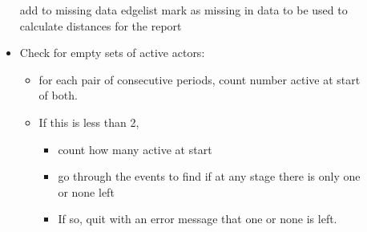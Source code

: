 \documentclass[12pt,a4paper]{article}
\renewcommand{\=}{\,=\,}
\newcommand{\+}{\,+\,}
\begin{document}
\begin{description}
\begin{itemize}
\begin{algorithmic}
\STATE add to missing data edgelist
\STATE mark as missing in data to be used to calculate distances for the report
\ENDIF
\ENDFOR
\ENDFOR
\ENDFOR
\end{algorithmic}
\item
Check for empty sets of active actors:
\begin{itemize}
\item for each pair of consecutive periods, count number active at start of
  both.
\item If this is less than 2,
\begin{itemize}
\item count how many active at start
\item go through the events to find if at any stage there is only one or
  none left
\item If so, quit with an error message that one or none is left.
\end{itemize}
\end{itemize}
\end{itemize}

\end{description}
\end{document}
